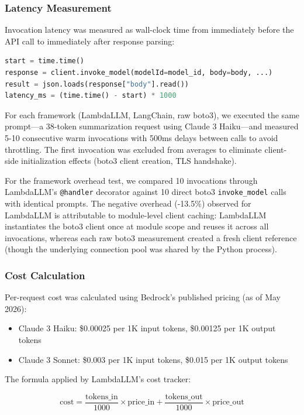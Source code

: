 \documentclass[11pt,a4paper]{article}
\begin{document}
\subsubsection{Latency Measurement}

Invocation latency was measured as wall-clock time from immediately before the API call to immediately after response parsing:

\begin{lstlisting}[language=Python]
start = time.time()
response = client.invoke_model(modelId=model_id, body=body, ...)
result = json.loads(response["body"].read())
latency_ms = (time.time() - start) * 1000
\end{lstlisting}

For each framework (LambdaLLM, LangChain, raw boto3), we executed the same prompt---a 38-token summarization request using Claude 3 Haiku---and measured 5-10 consecutive warm invocations with 500ms delays between calls to avoid throttling. The first invocation was excluded from averages to eliminate client-side initialization effects (boto3 client creation, TLS handshake).

For the framework overhead test, we compared 10 invocations through LambdaLLM's \texttt{@handler} decorator against 10 direct boto3 \texttt{invoke\_model} calls with identical prompts. The negative overhead (-13.5\%) observed for LambdaLLM is attributable to module-level client caching: LambdaLLM instantiates the boto3 client once at module scope and reuses it across all invocations, whereas each raw boto3 measurement created a fresh client reference (though the underlying connection pool was shared by the Python process).

\subsubsection{Cost Calculation}

Per-request cost was calculated using Bedrock's published pricing (as of May 2026):

\begin{itemize}
    \item Claude 3 Haiku: \$0.00025 per 1K input tokens, \$0.00125 per 1K output tokens
    \item Claude 3 Sonnet: \$0.003 per 1K input tokens, \$0.015 per 1K output tokens
\end{itemize}

The formula applied by LambdaLLM's cost tracker:

\[
\text{cost} = \frac{\text{tokens\_in}}{1000} \times \text{price\_in} + \frac{\text{tokens\_out}}{1000} \times \text{price\_out}
\]
\end{document}
